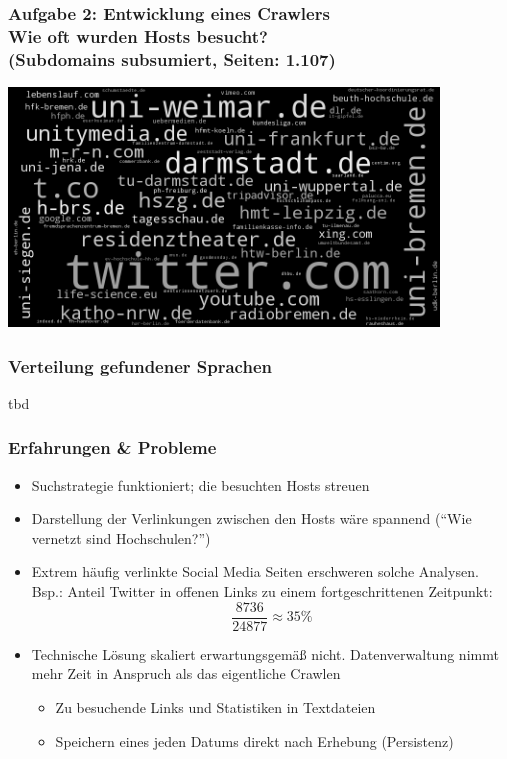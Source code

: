 \documentclass[accentcolor=tud7b,noresetcounter]{tudbeamer}
\begin{document}
  \begin{frame}[t]
  	\frametitle{Aufgabe 2: Entwicklung eines Crawlers\\
  	Wie oft wurden Hosts besucht?\\
  	(Subdomains subsumiert, Seiten: 1.107)}
  	
  	\includegraphics[width=\columnwidth, height=180pt]{../aufg02/wordcloud}	
	
  \end{frame}
  
  \begin{frame}
  	\frametitle{Verteilung gefundener Sprachen}
  	tbd
  \end{frame}
  
  \begin{frame}
  	\frametitle{Erfahrungen \& Probleme}
  	\begin{itemize}
		\item Suchstrategie funktioniert; die besuchten Hosts streuen
		\item Darstellung der Verlinkungen zwischen den Hosts wäre spannend ("`Wie vernetzt sind Hochschulen?"')
		\item Extrem häufig verlinkte Social Media Seiten erschweren solche Analysen. Bsp.: Anteil Twitter in offenen Links zu einem fortgeschrittenen Zeitpunkt: 
			$$\frac{8736}{24877}  \approx  35\%$$
  		\item Technische Lösung skaliert erwartungsgemäß nicht. Datenverwaltung nimmt mehr Zeit in Anspruch als das eigentliche Crawlen
			\begin{itemize}
				\item Zu besuchende Links und Statistiken in Textdateien
				\item Speichern eines jeden Datums direkt nach Erhebung (Persistenz)
			\end{itemize}

  	\end{itemize}

  \end{frame}

  
    

\end{document}

